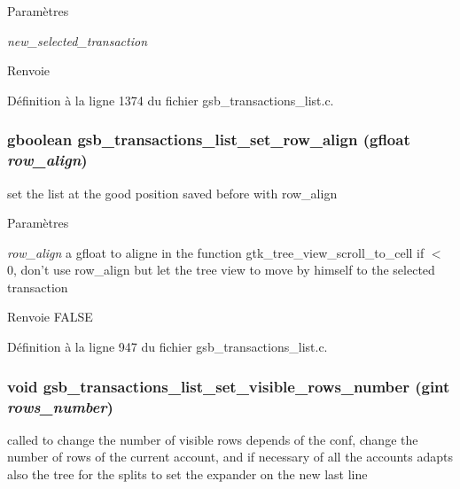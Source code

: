 \begin{DoxyParams}{Paramètres}
\item[{\em new\_\-selected\_\-transaction}]\end{DoxyParams}
\begin{DoxyReturn}{Renvoie}

\end{DoxyReturn}


Définition à la ligne 1374 du fichier gsb\_\-transactions\_\-list.c.

\subsubsection[{gsb\_\-transactions\_\-list\_\-set\_\-row\_\-align}]{\setlength{\rightskip}{0pt plus 5cm}gboolean gsb\_\-transactions\_\-list\_\-set\_\-row\_\-align (gfloat {\em row\_\-align})}\label{gsb__transactions__list_8c_a6de9b44e088a49d4d6328209a24443c2}
set the list at the good position saved before with row\_\-align


\begin{DoxyParams}{Paramètres}
\item[{\em row\_\-align}]a gfloat to aligne in the function gtk\_\-tree\_\-view\_\-scroll\_\-to\_\-cell if $<$ 0, don't use row\_\-align but let the tree view to move by himself to the selected transaction\end{DoxyParams}
\begin{DoxyReturn}{Renvoie}
FALSE 
\end{DoxyReturn}


Définition à la ligne 947 du fichier gsb\_\-transactions\_\-list.c.

\subsubsection[{gsb\_\-transactions\_\-list\_\-set\_\-visible\_\-rows\_\-number}]{\setlength{\rightskip}{0pt plus 5cm}void gsb\_\-transactions\_\-list\_\-set\_\-visible\_\-rows\_\-number (gint {\em rows\_\-number})}\label{gsb__transactions__list_8c_a8da293358f10b57d3107c903fbd4ef12}
called to change the number of visible rows depends of the conf, change the number of rows of the current account, and if necessary of all the accounts adapts also the tree for the splits to set the expander on the new last line


